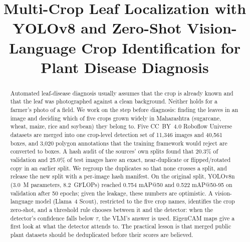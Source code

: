 \documentclass[conference]{IEEEtran}
\begin{document}
\title{Multi-Crop Leaf Localization with YOLOv8 and Zero-Shot Vision-Language Crop Identification for Plant Disease Diagnosis}

\author{
\and
{}
\and
{}
\and
{}
}

\maketitle

\begin{abstract}
Automated leaf-disease diagnosis usually assumes that the crop is already known and that the leaf was photographed against a clean background. Neither holds for a farmer's photo of a field. We work on the step before diagnosis: finding the leaves in an image and deciding which of five crops grown widely in Maharashtra (sugarcane, wheat, maize, rice and soybean) they belong to. Five CC~BY~4.0 Roboflow Universe datasets are merged into one crop-level detection set of 11,346 images and 40,561 boxes, and 3,020 polygon annotations that the training framework would reject are converted to boxes. A hash audit of the sources' own splits found that 20.3\% of validation and 25.0\% of test images have an exact, near-duplicate or flipped/rotated copy in an earlier split. We regroup the duplicates so that none crosses a split, and release the new split with a per-image hash manifest. On the original split, YOLOv8n (3.0~M parameters, 8.2~GFLOPs) reached 0.754 mAP@50 and 0.522 mAP@50-95 on validation after 50 epochs; given the leakage, these numbers are optimistic. A vision-language model (Llama~4 Scout), restricted to the five crop names, identifies the crop zero-shot, and a threshold rule chooses between it and the detector: when the detector's confidence falls below $\tau$, the VLM's answer is used. EigenCAM maps give a first look at what the detector attends to. The practical lesson is that merged public plant datasets should be deduplicated before their scores are believed.
\end{abstract}
\end{document}
